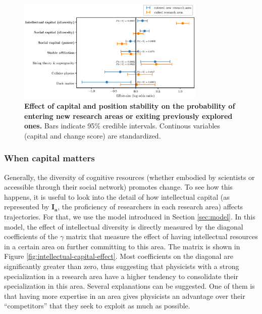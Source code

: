 \documentclass{article}
\begin{document}

\begin{figure}[h]
    \centering
    \includegraphics[width=0.8\textwidth]{plots/exited_score_effects_entropy.eps}
    \caption{\textbf{Effect of capital and position stability on the probability of entering new research areas or exiting previously explored ones.} Bars indicate 95\% credible intervals. Continous variables (capital and change score) are standardized.}
    \label{fig:diversification_score_effect}
\end{figure}


\subsubsection{When capital matters}

Generally, the diversity of cognitive resources (whether embodied by scientists or accessible through their social network) promotes change. To see how this happens, it is useful to look into the detail of how intellectual capital (as represented by $\bm{I_a}$, the proficiency of researchers in each research area) affects trajectories. For that, we use the model introduced in Section \ref{sec:model}. In this model, the effect of intellectual diversity is directly measured by the diagonal coefficients of the $\gamma$ matrix that measure the effect of having intellectual resources in a certain area on further committing to this area. The matrix is shown in Figure \ref{fig:intellectual-capital-effect}. Most coefficients on the diagonal are significantly greater than zero, thus suggesting that physicists with a strong specialization in a research area have a higher tendency to consolidate their specialization in this area. Several explanations can be suggested. One of them is that having more expertise in an area gives physicists an advantage over their ``competitors'' that they seek to exploit as much as possible.%
\end{document}
